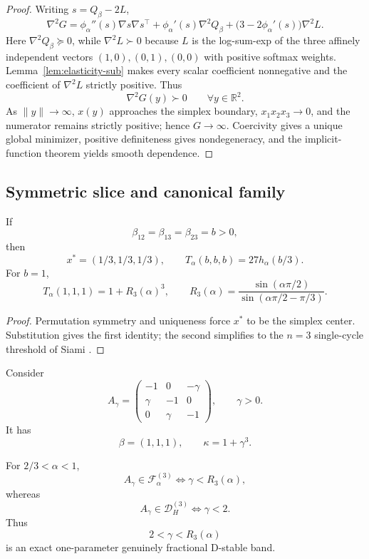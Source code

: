 \begin{proof}
Writing \(s=Q_\beta-2L\),
\[
\nabla^2G
=
\phi_\alpha''(s)\nabla s\nabla s^\top
+
\phi_\alpha'(s)\nabla^2Q_\beta
+
\bigl(3-2\phi_\alpha'(s)\bigr)\nabla^2L.
\]
Here \(\nabla^2Q_\beta\succeq0\), while \(\nabla^2L\succ0\) because \(L\) is the log-sum-exp of the three affinely independent vectors \((1,0),(0,1),(0,0)\) with positive softmax weights. Lemma~\ref{lem:elasticity-sub} makes every scalar coefficient nonnegative and the coefficient of \(\nabla^2L\) strictly positive. Thus
\[
\nabla^2G(y)\succ0
\qquad
\forall y\in\mathbb R^2.
\]
As \(\|y\|\to\infty\), \(x(y)\) approaches the simplex boundary, \(x_1x_2x_3\to0\), and the numerator remains strictly positive; hence \(G\to\infty\). Coercivity gives a unique global minimizer, positive definiteness gives nondegeneracy, and the implicit-function theorem yields smooth dependence.
\end{proof}

\subsection{Symmetric slice and canonical family}

\begin{corollary}
\label{cor:symmetric-slice}
If
\[
\beta_{12}=\beta_{13}=\beta_{23}=b>0,
\]
then
\[
x^*=(1/3,1/3,1/3),
\qquad
T_\alpha(b,b,b)=27h_\alpha(b/3).
\]
For \(b=1\),
\[
T_\alpha(1,1,1)=1+R_3(\alpha)^3,
\qquad
R_3(\alpha)
=
\frac{\sin(\alpha\pi/2)}
{\sin(\alpha\pi/2-\pi/3)}.
\]
\end{corollary}

\begin{proof}
Permutation symmetry and uniqueness force \(x^*\) to be the simplex center. Substitution gives the first identity; the second simplifies to the \(n=3\) single-cycle threshold of Siami \cite{Siami2021}.
\end{proof}

Consider
\[
A_\gamma
=
\begin{pmatrix}
-1&0&-\gamma\\
\gamma&-1&0\\
0&\gamma&-1
\end{pmatrix},
\qquad
\gamma>0.
\]
It has
\[
\beta=(1,1,1),
\qquad
\kappa=1+\gamma^3.
\]

\begin{corollary}
\label{cor:cyclic-family}
For \(2/3<\alpha<1\),
\[
A_\gamma\in\mathcal F_\alpha^{(3)}
\iff
\gamma<R_3(\alpha),
\]
whereas
\[
A_\gamma\in\mathcal D_H^{(3)}
\iff
\gamma<2.
\]
Thus
\[
2<\gamma<R_3(\alpha)
\]
is an exact one-parameter genuinely fractional D-stable band.
\end{corollary}

